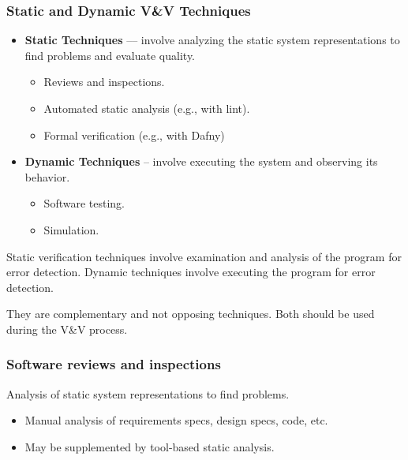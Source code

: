 \documentclass[../ESOF_notes.tex]{subfiles}
\begin{document}
\subsubsection{Static and Dynamic V\&V Techniques}
\begin{itemize}
    \item \textbf{Static Techniques} –– involve analyzing the
          static system representations to find problems and 
          evaluate quality.
          \begin{itemize}
              \item Reviews and inspections.
              \item Automated static analysis (e.g., with lint).
              \item Formal verification (e.g., with Dafny)
          \end{itemize}
    \item \textbf{Dynamic Techniques} – involve executing the system and
          observing its behavior.
          \begin{itemize}
              \item Software testing.
              \item Simulation.
          \end{itemize}
\end{itemize}

Static verification techniques involve examination and
analysis of the program for error detection. Dynamic
techniques involve executing the program for error
detection. 

They are complementary and not opposing techniques.
Both should be used during the V\&V process.
\pagebreak       
\subsubsection{Software reviews and inspections}

Analysis of static system representations to find problems.
\begin{itemize}
    \item Manual analysis of requirements specs,
          design specs, code, etc.
    \item  May be supplemented by tool-based
          static analysis.
\end{itemize}
\end{document}
